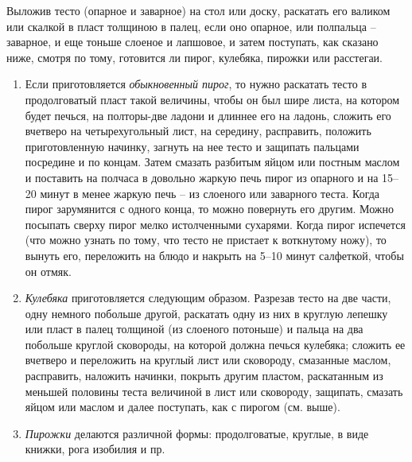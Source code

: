 Выложив тесто (опарное и заварное) на стол или доску, раскатать его валиком или скалкой в пласт толщиною в палец, если оно опарное, или полпальца – заварное, и еще тоньше слоеное и лапшовое, и затем поступать, как сказано ниже, смотря по тому, готовится ли пирог, кулебяка, пирожки или расстегаи.

\begin{enumerate}
	\item Если приготовляется \emph{обыкновенный пирог}, то нужно раскатать тесто в продолговатый пласт такой величины, чтобы он был шире листа, на котором будет печься, на полторы-две ладони и длиннее его на ладонь, сложить его вчетверо на четырехугольный лист, на середину, расправить, положить приготовленную начинку, загнуть на нее тесто и защипать пальцами посредине и по концам. Затем смазать разбитым яйцом или постным маслом и поставить на полчаса в довольно жаркую печь пирог из опарного и на 15–20 минут в менее жаркую печь – из слоеного или заварного теста. Когда пирог зарумянится с одного конца, то можно повернуть его другим. Можно посыпать сверху пирог мелко истолченными сухарями. Когда пирог испечется (что можно узнать по тому, что тесто не пристает к воткнутому ножу), то вынуть его, переложить на блюдо и накрыть на 5–10 минут салфеткой, чтобы он отмяк.
	\item \emph{Кулебяка} приготовляется следующим образом. Разрезав тесто на две части, одну немного побольше другой, раскатать одну из них в круглую лепешку или пласт в палец толщиной (из слоеного потоньше) и пальца на два побольше круглой сковороды, на которой должна печься кулебяка; сложить ее вчетверо и переложить на круглый лист или сковороду, смазанные маслом, расправить, наложить начинки, покрыть другим пластом, раскатанным из меньшей половины теста величиной в лист или сковороду, защипать, смазать яйцом или маслом и далее поступать, как с пирогом (см. выше).
	\item \emph{Пирожки} делаются различной формы: продолговатые, круглые, в виде книжки, рога изобилия и пр. 


\end{enumerate}
